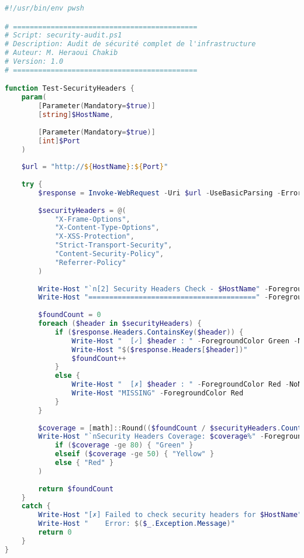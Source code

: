 \documentclass[11pt,a4paper]{report}
\begin{document}
\begin{lstlisting}[language=PowerShell, caption=security-audit.ps1 - Audit de Sécurité Complet, basicstyle=\ttfamily\tiny]
#!/usr/bin/env pwsh

# ============================================
# Script: security-audit.ps1
# Description: Audit de sécurité complet de l'infrastructure
# Auteur: M. Heraoui Chakib
# Version: 1.0
# ============================================

function Test-SecurityHeaders {
    param(
        [Parameter(Mandatory=$true)]
        [string]$HostName,
        
        [Parameter(Mandatory=$true)]
        [int]$Port
    )
    
    $url = "http://${HostName}:${Port}"
    
    try {
        $response = Invoke-WebRequest -Uri $url -UseBasicParsing -ErrorAction Stop
        
        $securityHeaders = @(
            "X-Frame-Options",
            "X-Content-Type-Options",
            "X-XSS-Protection",
            "Strict-Transport-Security",
            "Content-Security-Policy",
            "Referrer-Policy"
        )
        
        Write-Host "`n[2] Security Headers Check - $HostName" -ForegroundColor Cyan
        Write-Host "========================================" -ForegroundColor Cyan
        
        $foundCount = 0
        foreach ($header in $securityHeaders) {
            if ($response.Headers.ContainsKey($header)) {
                Write-Host "  [✓] $header : " -ForegroundColor Green -NoNewline
                Write-Host "$($response.Headers[$header])"
                $foundCount++
            }
            else {
                Write-Host "  [✗] $header : " -ForegroundColor Red -NoNewline
                Write-Host "MISSING" -ForegroundColor Red
            }
        }
        
        $coverage = [math]::Round(($foundCount / $securityHeaders.Count) * 100, 2)
        Write-Host "`nSecurity Headers Coverage: $coverage%" -ForegroundColor $(
            if ($coverage -ge 80) { "Green" } 
            elseif ($coverage -ge 50) { "Yellow" } 
            else { "Red" }
        )
        
        return $foundCount
    }
    catch {
        Write-Host "[✗] Failed to check security headers for $HostName" -ForegroundColor Red
        Write-Host "    Error: $($_.Exception.Message)"
        return 0
    }
}


\end{lstlisting}
\end{document}
